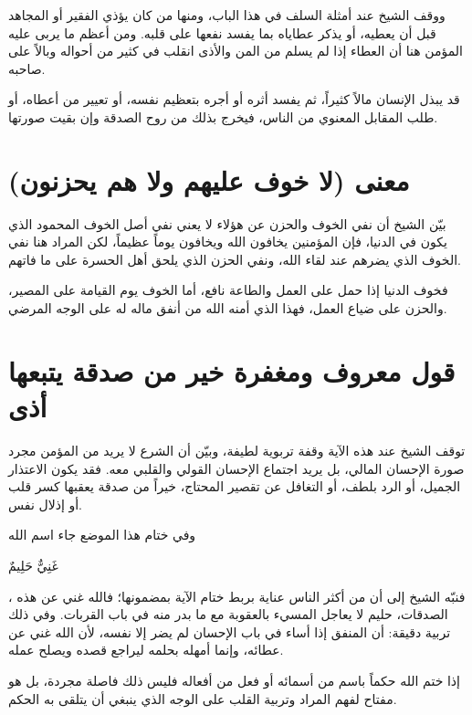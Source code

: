 ووقف الشيخ عند أمثلة السلف في هذا الباب، ومنها من كان يؤذي الفقير أو المجاهد قبل أن يعطيه، أو يذكر عطاياه بما يفسد نفعها على قلبه. ومن أعظم ما يربى عليه المؤمن هنا أن العطاء إذا لم يسلم من المن والأذى انقلب في كثير من أحواله وبالاً على صاحبه.

\begin{fawaid}
قد يبذل الإنسان مالاً كثيراً، ثم يفسد أثره أو أجره بتعظيم نفسه، أو تعيير من أعطاه، أو طلب المقابل المعنوي من الناس، فيخرج بذلك من روح الصدقة وإن بقيت صورتها.
\end{fawaid}

\section{معنى (لا خوف عليهم ولا هم يحزنون)}
بيّن الشيخ أن نفي الخوف والحزن عن هؤلاء لا يعني نفي أصل الخوف المحمود الذي يكون في الدنيا، فإن المؤمنين يخافون الله ويخافون يوماً عظيماً، لكن المراد هنا نفي الخوف الذي يضرهم عند لقاء الله، ونفي الحزن الذي يلحق أهل الحسرة على ما فاتهم.

فخوف الدنيا إذا حمل على العمل والطاعة نافع، أما الخوف يوم القيامة على المصير، والحزن على ضياع العمل، فهذا الذي أمنه الله من أنفق ماله له على الوجه المرضي.

\section{قول معروف ومغفرة خير من صدقة يتبعها أذى}
توقف الشيخ عند هذه الآية وقفة تربوية لطيفة، وبيّن أن الشرع لا يريد من المؤمن مجرد صورة الإحسان المالي، بل يريد اجتماع الإحسان القولي والقلبي معه. فقد يكون الاعتذار الجميل، أو الرد بلطف، أو التغافل عن تقصير المحتاج، خيراً من صدقة يعقبها كسر قلب أو إذلال نفس.

وفي ختام هذا الموضع جاء اسم الله \begin{ayah}غَنِيٌّ حَلِيمٌ\end{ayah}، فنبّه الشيخ إلى أن  من أكثر الناس عناية بربط ختام الآية بمضمونها؛ فالله غني عن هذه الصدقات، حليم لا يعاجل المسيء بالعقوبة مع ما بدر منه في باب القربات. وفي ذلك تربية دقيقة: أن المنفق إذا أساء في باب الإحسان لم يضر إلا نفسه، لأن الله غني عن عطائه، وإنما أمهله بحلمه ليراجع قصده ويصلح عمله.

\begin{fawaid}
إذا ختم الله حكماً باسم من أسمائه أو فعل من أفعاله فليس ذلك فاصلة مجردة، بل هو مفتاح لفهم المراد وتربية القلب على الوجه الذي ينبغي أن يتلقى به الحكم.
\end{fawaid}

